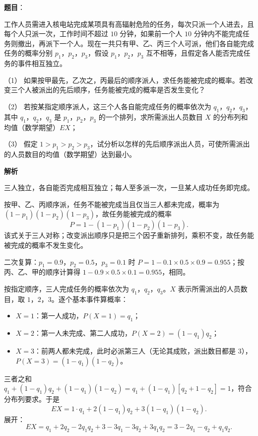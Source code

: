\begin{answer}

\textbf{题目}：

工作人员需进入核电站完成某项具有高辐射危险的任务，每次只派一个人进去，且每个人只派一次，工作时间不超过 $10$ 分钟，如果前一个人 $10$ 分钟内不能完成任务则撤出，再派下一个人。现在一共只有甲、乙、丙三个人可派，他们各自能完成任务的概率分别 $p_1$，$p_2$，$p_3$，假设 $p_1$，$p_2$，$p_3$ 互不相等，且假定各人能否完成任务的事件相互独立。

（1） 如果按甲最先，乙次之，丙最后的顺序派人，求任务能被完成的概率。若改变三个人被派出的先后顺序，任务能被完成的概率是否发生变化？

（2） 若按某指定顺序派人，这三个人各自能完成任务的概率依次为 $q_1$，$q_2$，$q_3$，其中 $q_1$，$q_2$，$q_3$ 是 $p_1$，$p_2$，$p_3$ 的一个排列，求所需派出人员数目 $X$ 的分布列和均值（数学期望）$EX$；

（3） 假定 $1>p_1>p_2>p_3$，试分析以怎样的先后顺序派出人员，可使所需派出的人员数目的均值（数学期望）达到最小。

\textbf{解析}

三人独立，各自能否完成相互独立；每人至多派一次，一旦某人成功任务即完成。

按甲、乙、丙顺序派，任务不能被完成当且仅当三人都未完成，概率为 $(1-p_1)(1-p_2)(1-p_3)$，故任务能被完成的概率
\nopagebreak[4]
\[P=1-(1-p_1)(1-p_2)(1-p_3).\]
该式关于三人对称；改变派出顺序只是把三个因子重新排列，乘积不变，故任务能被完成的概率不发生变化。

二次复算：$p_1=0.9$，$p_2=0.5$，$p_3=0.1$ 时 $P=1-0.1\times0.5\times0.9=0.955$；按丙、乙、甲的顺序计算得 $1-0.9\times0.5\times0.1=0.955$，相同。

按指定顺序，三人完成任务的概率依次为 $q_1$，$q_2$，$q_3$。$X$ 表示所需派出的人员数目，取 $1$，$2$，$3$。逐个基本事件算概率：

\begin{itemize}
\item $X=1$：第一人成功，$P(X=1)=q_1$；
\item $X=2$：第一人未完成、第二人成功，$P(X=2)=(1-q_1)q_2$；
\item $X=3$：前两人都未完成，此时必派第三人（无论其成败，派出数目都是 $3$），$P(X=3)=(1-q_1)(1-q_2)$。
\end{itemize}

三者之和 $q_1+(1-q_1)q_2+(1-q_1)(1-q_2)=q_1+(1-q_1)\left[q_2+1-q_2\right]=1$，符合分布列要求。于是
\nopagebreak[4]
\[EX=1\cdot q_1+2(1-q_1)q_2+3(1-q_1)(1-q_2).\]
展开：
\nopagebreak[4]
\[EX=q_1+2q_2-2q_1q_2+3-3q_1-3q_2+3q_1q_2=3-2q_1-q_2+q_1q_2.\]


\end{answer}
